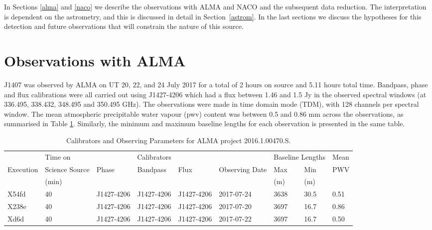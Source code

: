 \documentclass[twocolumn]{aa} %
\begin{document}
In Sections \ref{alma} and \ref{naco} we describe the observations with ALMA and NACO and the subsequent data reduction.
%
The interpretation is dependent on the astrometry, and this is discussed in detail in Section~\ref{astrom}.
%
In the last sections we discuss the hypotheses for this detection and future observations that will constrain the nature of this source.

\section{Observations with ALMA\label{alma}} %

J1407 was observed by ALMA on UT 20, 22, and 24 July 2017 for a total of 2 hours on source and 5.11 hours total time.
%
Bandpass, phase and flux calibrations were all carried out using J1427-4206 which had a flux between 1.46 and 1.5 Jy in the observed spectral windows (at 336.495, 338.432, 348.495 and 350.495 GHz).
%
The observations were made in time domain mode (TDM), with 128 channels per spectral window.
%
The mean atmospheric precipitable water vapour (pwv) content was between 0.5 and 0.86 mm across the observations, as summarised in Table \ref{tab:Obs_params}.
%
Similarly, the minimum and maximum baseline lengths for each observation is presented in the same table. 

\begin{table}
\caption{Calibrators and Observing Parameters for ALMA project 2016.1.00470.S.}
\begin{tabular}{lllllllll}
\hline \hline
&Time on & \multicolumn{3}{c}{Calibrators} & & \multicolumn{2}{c}{Baseline Lengths} & Mean \\ \cline{3-5} \cline{7-8}
Execution  & Science Source & Phase & Bandpass & Flux & Observing Date & Max & Min & PWV\\
 & (min) &&&&&(m) &(m)\\
 \hline
X54fd & 40 & J1427-4206 & J1427-4206 & J1427-4206 & 2017-07-24 & 3638 & 30.5 &0.51\\
X238e & 40 & J1427-4206 & J1427-4206 & J1427-4206 & 2017-07-20 & 3697 & 16.7 &0.86\\
Xd6d & 40 & J1427-4206 & J1427-4206 & J1427-4206 & 2017-07-22 & 3697 & 16.7 &0.50\\
\hline
\end{tabular}
\label{tab:Obs_params}
\end{table}
\end{document}
